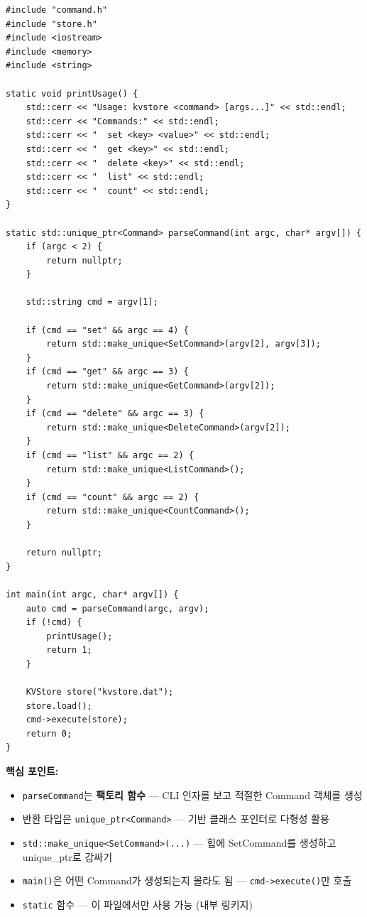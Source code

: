 \documentclass[11pt,a4paper]{book}
\newcommand{\file}[1]{\texttt{#1}}
\newcommand{\code}[1]{\texttt{#1}}
\begin{document}
\begin{lstlisting}[style=cpp,title={\file{src/main.cpp} (완성)}]
#include "command.h"
#include "store.h"
#include <iostream>
#include <memory>
#include <string>

static void printUsage() {
    std::cerr << "Usage: kvstore <command> [args...]" << std::endl;
    std::cerr << "Commands:" << std::endl;
    std::cerr << "  set <key> <value>" << std::endl;
    std::cerr << "  get <key>" << std::endl;
    std::cerr << "  delete <key>" << std::endl;
    std::cerr << "  list" << std::endl;
    std::cerr << "  count" << std::endl;
}

static std::unique_ptr<Command> parseCommand(int argc, char* argv[]) {
    if (argc < 2) {
        return nullptr;
    }

    std::string cmd = argv[1];

    if (cmd == "set" && argc == 4) {
        return std::make_unique<SetCommand>(argv[2], argv[3]);
    }
    if (cmd == "get" && argc == 3) {
        return std::make_unique<GetCommand>(argv[2]);
    }
    if (cmd == "delete" && argc == 3) {
        return std::make_unique<DeleteCommand>(argv[2]);
    }
    if (cmd == "list" && argc == 2) {
        return std::make_unique<ListCommand>();
    }
    if (cmd == "count" && argc == 2) {
        return std::make_unique<CountCommand>();
    }

    return nullptr;
}

int main(int argc, char* argv[]) {
    auto cmd = parseCommand(argc, argv);
    if (!cmd) {
        printUsage();
        return 1;
    }

    KVStore store("kvstore.dat");
    store.load();
    cmd->execute(store);
    return 0;
}
\end{lstlisting}

\textbf{핵심 포인트:}
\begin{itemize}[nosep]
\item \code{parseCommand}는 \textbf{팩토리 함수} — CLI 인자를 보고 적절한 Command 객체를 생성
\item 반환 타입은 \code{unique\_ptr<Command>} — 기반 클래스 포인터로 다형성 활용
\item \code{std::make\_unique<SetCommand>(...)} — 힙에 SetCommand를 생성하고 unique\_ptr로 감싸기
\item \code{main()}은 어떤 Command가 생성되는지 몰라도 됨 — \code{cmd->execute()}만 호출
\item \code{static} 함수 — 이 파일에서만 사용 가능 (내부 링키지)
\end{itemize}
\end{document}
